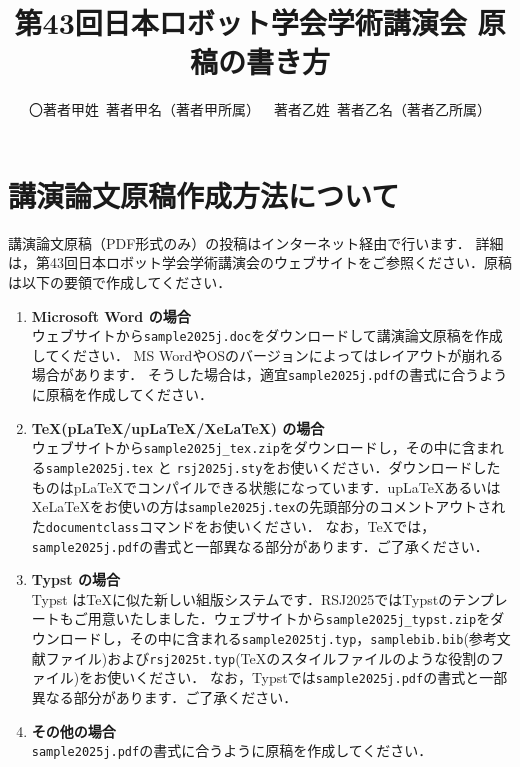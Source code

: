 \documentclass[twocolumn]{jarticle} %
\begin{document}
\title{第43回日本ロボット学会学術講演会 原稿の書き方}
\author{〇著者甲姓\ 著者甲名（著者甲所属）\ \ 著者乙姓\ 著者乙名（著者乙所属）}
\setlength{\baselineskip}{4.4mm}	%
\maketitle
\thispagestyle{empty}
\pagestyle{empty}

\section{講演論文原稿作成方法について}
講演論文原稿（PDF形式のみ）の投稿はインターネット経由で行います．
詳細は，第43回日本ロボット学会学術講演会のウェブサイト\cite{website}をご参照ください．原稿は以下の要領で作成してください．

\begin{enumerate}
    \item {\bfseries Microsoft Word の場合}\\
    ウェブサイト\cite{website}から\verb|sample2025j.doc|をダウンロードして講演論文原稿を作成してください．
    MS WordやOSのバージョンによってはレイアウトが崩れる場合があります．
    そうした場合は，適宜\verb|sample2025j.pdf|の書式に合うように原稿を作成してください．

  \item {\bfseries \TeX (pLaTeX/upLaTeX/XeLaTeX) の場合}\\
    ウェブサイト\cite{website}から\verb|sample2025j_tex.zip|をダウンロードし，その中に含まれる\verb|sample2025j.tex| と \verb|rsj2025j.sty|をお使いください．ダウンロードしたものはpLaTeXでコンパイルできる状態になっています．upLaTeXあるいはXeLaTeXをお使いの方は\verb|sample2025j.tex|の先頭部分のコメントアウトされた\verb|documentclass|コマンドをお使いください．
    なお，\TeX では，\verb|sample2025j.pdf|の書式と一部異なる部分があります．ご了承ください．
  \item {\bfseries Typst の場合}\\
    Typst\cite{typst} は\TeX{}に似た新しい組版システムです．RSJ2025ではTypstのテンプレートもご用意いたしました．ウェブサイト\cite{website}から\verb|sample2025j_typst.zip|をダウンロードし，その中に含まれる\verb|sample2025tj.typ|，\verb|samplebib.bib|(参考文献ファイル)および\verb|rsj2025t.typ|(\TeX{}のスタイルファイルのような役割のファイル)をお使いください．
    なお，Typstでは\verb|sample2025j.pdf|の書式と一部異なる部分があります．ご了承ください．
    \item {\bfseries その他の場合}\\        
    \verb|sample2025j.pdf|の書式に合うように原稿を作成してください．
\end{enumerate}
\end{document}
